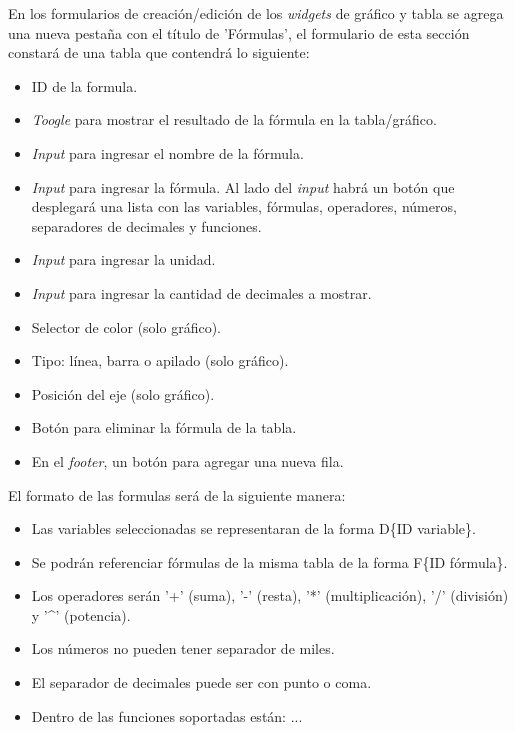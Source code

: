 En los formularios de creación/edición de los \textit{widgets} de gráfico y tabla se agrega una nueva pestaña con el título de 'Fórmulas', el formulario de esta sección constará de una tabla que contendrá lo siguiente:
\begin{itemize}
    \item ID de la formula.
    \item \textit{Toogle} para mostrar el resultado de la fórmula en la tabla/gráfico.
    \item \textit{Input} para ingresar el nombre de la fórmula.
    \item \textit{Input} para ingresar la fórmula. Al lado del \textit{input} habrá un botón que desplegará una lista con las variables, fórmulas, operadores, números, separadores de decimales y funciones.
    \item \textit{Input} para ingresar la unidad.
    \item \textit{Input} para ingresar la cantidad de decimales a mostrar.
    \item Selector de color (solo gráfico).
    \item Tipo: línea, barra o apilado (solo gráfico).
    \item Posición del eje (solo gráfico).
    \item Botón para eliminar la fórmula de la tabla.
    \item En el \textit{footer}, un botón para agregar una nueva fila.
\end{itemize}

El formato de las formulas será de la siguiente manera:
\begin{itemize}
    \item Las variables seleccionadas se representaran de la forma D\{ID variable\}.
    \item Se podrán referenciar fórmulas de la misma tabla de la forma F\{ID fórmula\}.
    \item Los operadores serán '+' (suma), '-' (resta), '*' (multiplicación), '/' (división) y '\^{}' (potencia).
    \item Los números no pueden tener separador de miles.
    \item El separador de decimales puede ser con punto o coma.
    \item Dentro de las funciones soportadas están: ...
\end{itemize}

